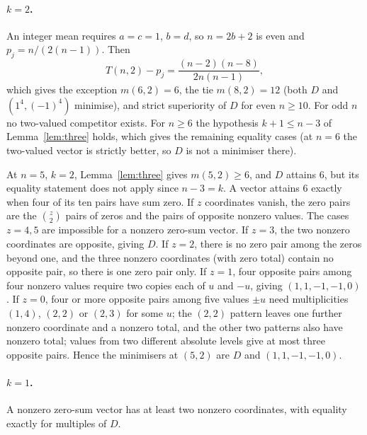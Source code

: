 \documentclass[11pt]{article}
\theoremstyle{remark}
\begin{document}
\paragraph{\(k=2\).}
An integer mean requires \(a=c=1\), \(b=d\), so \(n=2b+2\) is even and
\(p_j=n/(2(n-1))\). Then
\[
 T(n,2)-p_j=\frac{(n-2)(n-8)}{2n(n-1)},
\]
which gives the exception \(m(6,2)=6\), the tie \(m(8,2)=12\) (both \(D\) and
\((1^4,(-1)^4)\) minimise), and strict superiority of \(D\) for even \(n\ge10\).
For odd \(n\) no two-valued competitor exists. For \(n\ge6\) the hypothesis
\(k+1\le n-3\) of Lemma~\ref{lem:three} holds, which gives the remaining
equality cases (at \(n=6\) the two-valued vector is strictly better, so \(D\)
is not a minimiser there).

At \(n=5\), \(k=2\), Lemma~\ref{lem:three} gives \(m(5,2)\ge6\), and \(D\)
attains \(6\), but its equality statement does not apply since \(n-3=k\). A
vector attains \(6\) exactly when four of its ten pairs have sum zero. If
\(z\) coordinates vanish, the zero pairs are the \(\binom z2\) pairs of zeros
and the pairs of opposite nonzero values. The cases \(z=4,5\) are impossible
for a nonzero zero-sum vector. If \(z=3\), the two nonzero coordinates are
opposite, giving \(D\). If \(z=2\), there is no zero pair among the zeros
beyond one, and the three nonzero coordinates (with zero total) contain no
opposite pair, so there is one zero pair only. If \(z=1\), four opposite pairs
among four nonzero values require two copies each of \(u\) and \(-u\), giving
\((1,1,-1,-1,0)\). If \(z=0\), four or more opposite pairs among five values
\(\pm u\) need multiplicities \((1,4)\), \((2,2)\) or \((2,3)\) for some
\(u\); the \((2,2)\) pattern leaves one further nonzero coordinate and a
nonzero total, and the other two patterns also have nonzero total; values
from two different absolute levels give at most three opposite pairs. Hence
the minimisers at \((5,2)\) are \(D\) and \((1,1,-1,-1,0)\).

\paragraph{\(k=1\).}
A nonzero zero-sum vector has at least two nonzero coordinates, with equality
exactly for multiples of \(D\).
\end{document}

